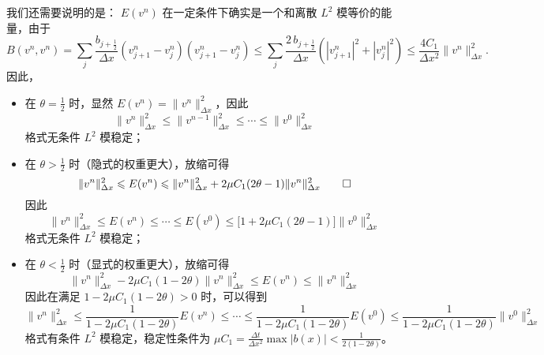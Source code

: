 \begin{solution*}
    我们还需要说明的是： $E(v^n)$ 在一定条件下确实是一个和离散 $L^2$ 模等价的能量，由于
    \[
        B(v^{n}, v^n) ={} \sum_j \frac{b_{j+\frac12}}{\Delta x}(v_{j+1}^n-v_{j}^n)(v_{j+1}^n-v_{j}^n)
        \le{} \sum_j \frac{2\,b_{j+\frac12}}{\Delta x}\left(|v_{j+1}^n|^2 + |v_{j}^n|^2\right)
        \le \frac{4 C_1}{\Delta x^2} \| v^n \|_{\Delta x}^2.
    \]
    因此，
    \begin{itemize}
        \item 在 $\theta = \frac12$ 时，显然 $E(v^n) = \|v^{n}\|_{\Delta x}^2$，因此
              \[
                  \|v^{n}\|_{\Delta x}^2 \le \|v^{n-1}\|_{\Delta x}^2 \le  \cdots \le \|v^{0}\|_{\Delta x}^2
              \]
              格式无条件 $L^2$ 模稳定；

        \item 在 $\theta > \frac12$ 时（隐式的权重更大），放缩可得
              \[
                  \|v^{n}\|_{\Delta x}^2  \le E(v^n) \le  \|v^{n}\|_{\Delta x}^2  +  2 \mu C_1(2\theta-1) \|v^{n}\|_{\Delta x}^2 \qedhere
              \]
              因此
              \[
                  \|v^{n}\|_{\Delta x}^2 \le E(v^n) \le \cdots \le E(v^0)
                  \le \Big[ 1 +  2 \mu C_1(2\theta-1)\Big] \|v^{0}\|_{\Delta x}^2
              \]
              格式无条件 $L^2$ 模稳定；

        \item 在 $\theta < \frac12$ 时（显式的权重更大），放缩可得
              \[
                  \|v^{n}\|_{\Delta x}^2  -  2 \mu C_1(1-2\theta) \|v^{n}\|_{\Delta x}^2 \le E(v^n) \le   \| v^n \|_{\Delta x}^2
              \]
              因此在满足 $1 - 2 \mu C_1(1-2\theta) > 0$ 时，可以得到
              {\small\[
                  \|v^{n}\|_{\Delta x}^2 \le \frac{1}{1 - 2 \mu C_1(1-2\theta)} E(v^n)
                  \le \cdots
                  \le \frac{1}{1 - 2 \mu C_1(1-2\theta)} E(v^0)
                  \le \frac{1}{1 - 2 \mu C_1(1-2\theta)} \|v^{0}\|_{\Delta x}^2
              \]}
              格式有条件 $L^2$ 模稳定，稳定性条件为 $\mu C_1 = \frac{\Delta t}{\Delta x^2} \max|b(x)| < \frac{1}{2(1-2\theta)}$。
    \end{itemize}
\end{solution*}

